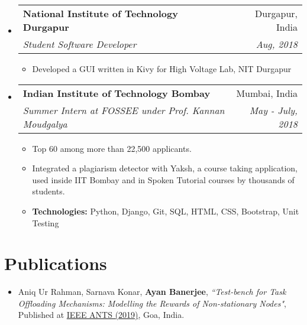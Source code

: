 \documentclass[a4paper,11pt]{article}
\makeatletter
\newcommand{\resumeSubheading}[4]{
  \vspace{-1pt}\item
    \begin{tabular*}{0.97\textwidth}[t]{l@{\extracolsep{\fill}}r}
      \textbf{#1 } & #2 \\
      \textit{\small#3} & \textit{\small #4} \\
    \end{tabular*}\vspace{-5pt}
}
\newcommand{\resumeSubHeadingListStart}{\begin{itemize}[leftmargin=*, topsep=0pt]}
\newcommand{\resumeSubHeadingListEnd}{\end{itemize}}
\newcommand{\resumeItemListStart}{\begin{itemize}}
\newcommand{\resumeItemListEnd}{\end{itemize}\vspace{-5pt}}
\makeatother
\begin{document}
    \resumeSubHeadingListStart
      \resumeSubheading
      {National Institute of Technology Durgapur}{Durgapur, India}
      {Student Software Developer}{Aug, 2018}
      \resumeItemListStart
        \item\small
        {Developed a GUI written in Kivy for High Voltage Lab, NIT Durgapur}
        \resumeItemListEnd
    \resumeSubHeadingListEnd
    
  \resumeSubHeadingListStart
    \resumeSubheading
    {Indian Institute of Technology Bombay}{Mumbai, India}
    {Summer Intern at FOSSEE under Prof. Kannan Moudgalya}{May - July, 2018}
    \resumeItemListStart
      \item\small
        {Top 60 among more than 22,500 applicants.}
      \item\small
        {Integrated a plagiarism detector with Yaksh, a course taking application, used inside IIT Bombay and in Spoken Tutorial courses by thousands of students.}
      \item\small
      {\textbf{Technologies:} Python, Django, Git, SQL, HTML, CSS, Bootstrap, Unit Testing}
    \resumeItemListEnd
  \resumeSubHeadingListEnd
 

\section{Publications}
    \setlength{\itemsep}{0.5pt}
    \begin{itemize}
        \item{Aniq Ur Rahman, Sarnava Konar, \textbf{Ayan Banerjee}, \textit{``Test-bench for Task Offloading Mechanisms: Modelling the Rewards of Non-stationary Nodes"}, Published at {\href{https://ants2019.ieee-comsoc-ants.org/}{IEEE ANTS (2019)}}, Goa, India.}
    \end{itemize}
\end{document}
